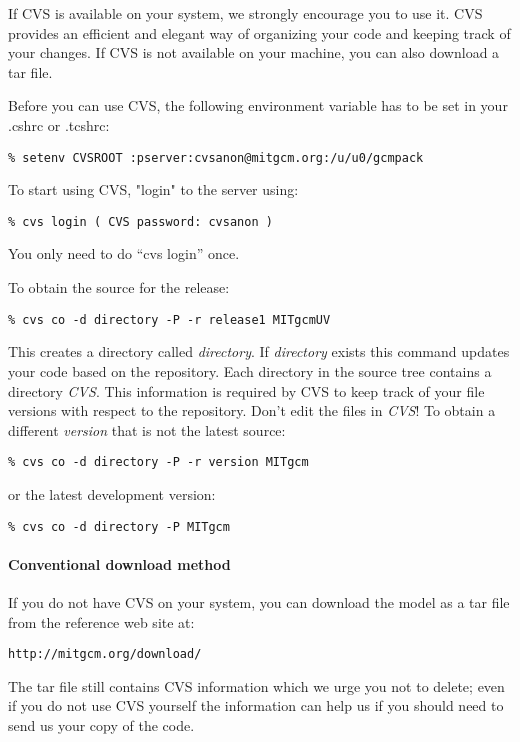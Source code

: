 If CVS is available on your system, we strongly encourage you to use it. CVS
provides an efficient and elegant way of organizing your code and keeping
track of your changes. If CVS is not available on your machine, you can also
download a tar file.

Before you can use CVS, the following environment variable has to be set in
your .cshrc or .tcshrc:
\begin{verbatim}
% setenv CVSROOT :pserver:cvsanon@mitgcm.org:/u/u0/gcmpack
\end{verbatim}

To start using CVS, "login" to the server using:
\begin{verbatim}
% cvs login ( CVS password: cvsanon )
\end{verbatim}
You only need to do ``cvs login'' once.

To obtain the source for the release:
\begin{verbatim}
% cvs co -d directory -P -r release1 MITgcmUV
\end{verbatim}

This creates a directory called \textit{directory}. If \textit{directory}
exists this command updates your code based on the repository. Each
directory in the source tree contains a directory \textit{CVS}. This
information is required by CVS to keep track of your file versions with
respect to the repository. Don't edit the files in \textit{CVS}! To obtain a
different \textit{version} that is not the latest source:
\begin{verbatim}
% cvs co -d directory -P -r version MITgcm
\end{verbatim}
or the latest development version:
\begin{verbatim}
% cvs co -d directory -P MITgcm
\end{verbatim}

\paragraph*{Conventional download method}
\label{sect:conventionalDownload}

If you do not have CVS on your system, you can download the model as a
tar file from the reference web site at:
\begin{verbatim}
http://mitgcm.org/download/
\end{verbatim}
The tar file still contains CVS information which we urge you not to
delete; even if you do not use CVS yourself the information can help
us if you should need to send us your copy of the code.

